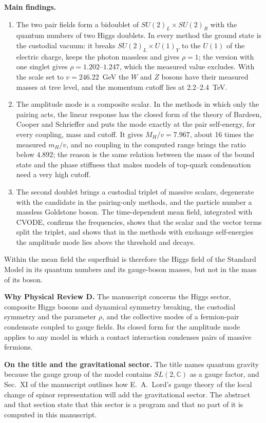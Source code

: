 \documentclass[11pt]{article}
\begin{document}
\textbf{Main findings.}
\begin{enumerate}
\item The two pair fields form a bidoublet of $SU(2)_L\times SU(2)_R$ with the quantum numbers of two Higgs doublets. In
every method the ground state is the custodial vacuum: it breaks $SU(2)_L\times U(1)_Y$ to the $U(1)$ of the electric
charge, keeps the photon massless and gives $\rho=1$; the version with one singlet gives $\rho=\ensuremath{1.202}\mbox{--}\ensuremath{1.247}$, which the
measured value excludes. With the scale set to $v=246.22$~GeV the $W$ and $Z$ bosons have their measured masses at tree
level, and the momentum cutoff lies at 2.2\mbox{--}2.4~TeV.
\item The amplitude mode is a composite scalar. In the methods in which only the pairing acts, the linear response has
the closed form of the theory of Bardeen, Cooper and Schrieffer and puts the mode exactly at the pair self-energy, for
every coupling, mass and cutoff. It gives $M_H/v=7.967$, about 16 times the measured $m_H/v$, and no
coupling in the computed range brings the ratio below \ensuremath{4.892}; the reason is the same relation between the mass of
the bound state and the phase stiffness that makes models of top-quark condensation need a very high cutoff.
\item The second doublet brings a custodial triplet of massive scalars, degenerate with the candidate in the pairing-only
methods, and the particle number a massless Goldstone boson. The time-dependent mean field, integrated with CVODE,
confirms the frequencies, shows that the scalar and the vector terms split the triplet, and shows that in the methods
with exchange self-energies the amplitude mode lies above the threshold and decays.
\end{enumerate}
Within the mean field the superfluid is therefore the Higgs field of the Standard Model in its quantum numbers and its
gauge-boson masses, but not in the mass of its boson.

\textbf{Why Physical Review D.} The manuscript concerns the Higgs sector, composite Higgs bosons and dynamical symmetry
breaking, the custodial symmetry and the parameter $\rho$, and the collective modes of a fermion-pair condensate
coupled to gauge fields. Its closed form for the amplitude mode applies to any model in which a contact interaction
condenses pairs of massive fermions.

\textbf{On the title and the gravitational sector.} The title names quantum gravity because the gauge group of the model
contains $SL(2,\mathbb C)$ as a gauge factor, and Sec.~XI of the manuscript outlines how E.~A.~Lord's gauge theory of the
local change of spinor representation will add the gravitational sector. The abstract and that section state that this
sector is a program and that no part of it is computed in this manuscript.
\end{document}
